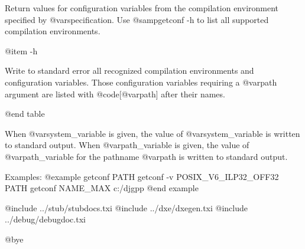 Return values for configuration variables from the compilation environment
specified by @var{specification}.  Use @samp{getconf -h} to list all
supported compilation environments.

@item -h

Write to standard error all recognized compilation environments and 
configuration variables.  Those configuration variables requiring a
@var{path} argument are listed with @code{[@var{path}]} after their names.

@end table

When @var{system_variable} is given, the value of @var{system_variable}
is written to standard output.  When @var{path_variable} is given, the
value of @var{path_variable} for the pathname @var{path} is written to
standard output.

Examples:
@example
getconf PATH
getconf -v POSIX_V6_ILP32_OFF32 PATH
getconf NAME_MAX c:/djgpp
@end example

@include ../stub/stubdocs.txi
@include ../dxe/dxegen.txi
@include ../debug/debugdoc.txi

@bye
